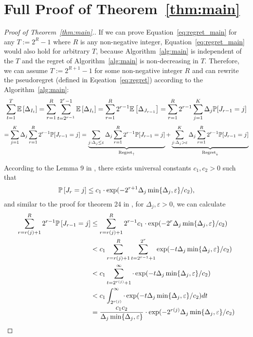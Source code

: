 \section{Full Proof of Theorem~\ref{thm:main}}
\label{sec:app_proof_main}
\begin{proof}[Proof of Theorem~\ref{thm:main}.]
If we can prove Equation~\ref{eq:regret_main} for any $T:=2^{R}-1$ where $R$ is any non-negative integer, Equation~\ref{eq:regret_main} would also hold for arbitrary $T$, because Algorithm~\ref{alg:main} is independent of the $T$ and the regret of Algorithm~\ref{alg:main} is non-decreasing in $T$.
Therefore, we can assume $T:=2^{R+1}-1$ for some non-negative integer $R$ and can rewrite the pseudoregret (defined in Eqeation~\ref{eq:regret}) according to the Algorithm~\ref{alg:main}:
$$
\sum_{t=1}^T \mathbb{E}\left[\Delta_{I_t}\right] = \sum_{r=1}^{R} \sum_{t=2^{r-1}}^{2^{r}-1}\mathbb{E}\left[\Delta_{I_t}\right] = \sum_{r=1}^{R} 2^{r-1}\mathbb{E}\left[\Delta_{J_{r-1}}\right] = \sum_{r=1}^{R} 2^{r-1}\sum_{j=1}^{K}\Delta_{j}\mathbb{P}[J_{r-1} = j]
$$
$$ 
= \sum_{j=1}^{K}\Delta_{j}\sum_{r=1}^{R} 2^{r-1}\mathbb{P}[J_{r-1} = j] = \underbrace{\sum_{j:\Delta_j\leq \varepsilon}\Delta_{j}\sum_{r=1}^{R} 2^{r-1}\mathbb{P}[J_{r-1} = j]}_{\text{Regret}_{\uparrow}} + \underbrace{\sum_{j:\Delta_j > \varepsilon}^{K}\Delta_{j}\sum_{r=1}^{R} 2^{r-1}\mathbb{P}[J_{r-1} = j]}_{\text{Regret}_{\downarrow}}
$$

According to the Lemma 9 in \citet{hu2021near}, there exists universal constants $c_1, c_2>0$ such that 
	\begin{align}
	\label{eq:tail}
	\mathbb{P}\left[J_r = j\right]\leq c_1\cdot \exp(-2^{r+1}\Delta_j \min\{\Delta_j, \varepsilon\} / c_2),
	\end{align}
and similar to the proof for theorem 24 in \citet{hu2021near}, for $\Delta_j, \varepsilon > 0$, we can calculate
\begin{align}
\label{eq:tail_sum}
	\sum_{r=r(j)+1}^{R}2^{r-1}\mathbb{P}\left[J_{r-1} = j\right] 
	&\leq \sum_{r=r(j)+1}^{R}2^{r-1} c_1\cdot \exp(-2^r\Delta_j \min\{\Delta_j, \varepsilon\} / c_2)\nonumber\\
	&< c_1 \sum_{r=r(j)+1}^{R}\sum_{t=2^{r-1}+1}^{2^{r}} \exp(-t\Delta_j \min\{\Delta_j, \varepsilon\} / c_2)\nonumber\\
	&< c_1\sum_{t=2^{r(j)}+1}^{\infty} \cdot \exp(-t\Delta_j \min\{\Delta_j, \varepsilon\} / c_2)\nonumber\\
	&< c_1\int_{2^{r(j)}}^{\infty} \cdot \exp(-t\Delta_j \min\{\Delta_j, \varepsilon\} / c_2)dt\nonumber\\
	&= \frac{c_1c_2}{\Delta_j \min\{\Delta_j, \varepsilon\}}\cdot \exp(-2^{r(j)}\Delta_j \min\{\Delta_j, \varepsilon\} / c_2)
\end{align}


\end{proof}
